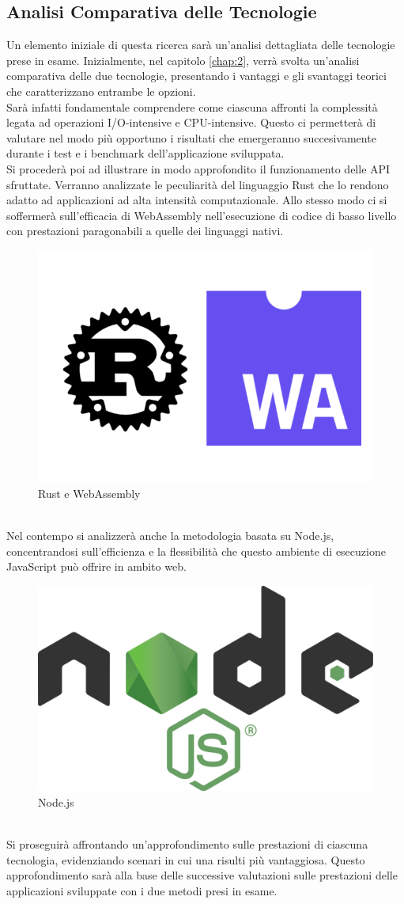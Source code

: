 \subsection{Analisi Comparativa delle Tecnologie}
Un elemento iniziale di questa ricerca sarà un'analisi dettagliata delle tecnologie prese in esame. 
Inizialmente, nel capitolo \ref{chap:2}, verrà svolta un'analisi comparativa delle due tecnologie, presentando i vantaggi e gli svantaggi teorici che caratterizzano entrambe le opzioni.
\\Sarà infatti fondamentale comprendere come ciascuna affronti la complessità legata ad operazioni I/O-intensive e CPU-intensive. Questo ci permetterà di valutare nel modo più opportuno i risultati che emergeranno succesivamente durante i test e i benchmark dell'applicazione sviluppata.
\\Si procederà poi ad illustrare in modo approfondito il funzionamento delle API sfruttate. Verranno analizzate le peculiarità del linguaggio Rust che lo rendono adatto ad applicazioni ad alta intensità computazionale. Allo stesso modo ci si soffermerà sull'efficacia di WebAssembly nell'esecuzione di codice di basso livello con prestazioni paragonabili a quelle dei linguaggi nativi.
\begin{figure}
        \begin{center}
                \includegraphics[width=0.3\columnwidth]{images/rustwasm.jpg}
        \end{center}
        \caption{Rust e WebAssembly}
        \label{fig:rustwasm}
\end{figure} 
\\Nel contempo si analizzerà anche la metodologia basata su Node.js, concentrandosi sull'efficienza e la flessibilità che questo ambiente di esecuzione JavaScript può offrire in ambito web.
\begin{figure}
        \begin{center}
                \includegraphics[width=0.3\columnwidth]{images/node.png}
        \end{center}
        \caption{Node.js}
        \label{fig:nodejs}
\end{figure} 
\\Si proseguirà affrontando un'approfondimento sulle prestazioni di ciascuna tecnologia, evidenziando scenari in cui una risulti più vantaggiosa. Questo approfondimento sarà alla base delle successive valutazioni sulle prestazioni delle applicazioni sviluppate con i due metodi presi in esame.

